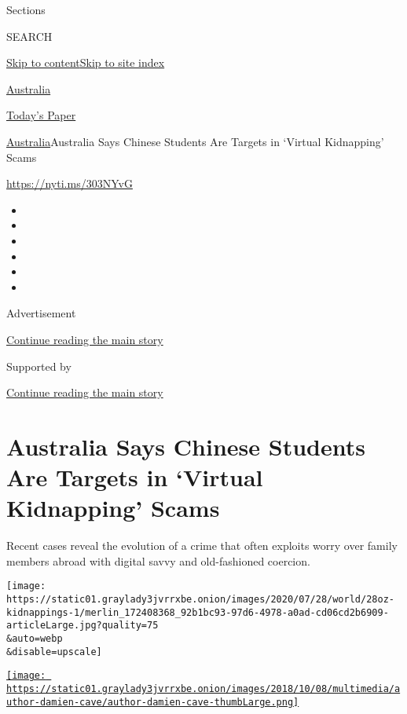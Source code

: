 Sections

SEARCH

\protect\hyperlink{site-content}{Skip to
content}\protect\hyperlink{site-index}{Skip to site index}

\href{https://www.nytimes3xbfgragh.onion/section/world/australia}{Australia}

\href{https://myaccount.nytimes3xbfgragh.onion/auth/login?response_type=cookie\&client_id=vi}{}

\href{https://www.nytimes3xbfgragh.onion/section/todayspaper}{Today's
Paper}

\href{/section/world/australia}{Australia}\textbar{}Australia Says
Chinese Students Are Targets in `Virtual Kidnapping' Scams

\url{https://nyti.ms/303NYvG}

\begin{itemize}
\item
\item
\item
\item
\item
\item
\end{itemize}

Advertisement

\protect\hyperlink{after-top}{Continue reading the main story}

Supported by

\protect\hyperlink{after-sponsor}{Continue reading the main story}

\hypertarget{australia-says-chinese-students-are-targets-in-virtual-kidnapping-scams}{%
\section{Australia Says Chinese Students Are Targets in `Virtual
Kidnapping'
Scams}\label{australia-says-chinese-students-are-targets-in-virtual-kidnapping-scams}}

Recent cases reveal the evolution of a crime that often exploits worry
over family members abroad with digital savvy and old-fashioned
coercion.

\texttt{[image: https://static01.graylady3jvrrxbe.onion/images/2020/07/28/world/28oz-kidnappings-1/merlin\_172408368\_92b1bc93-97d6-4978-a0ad-cd06cd2b6909-articleLarge.jpg?quality=75\\\&auto=webp\\\&disable=upscale]}

\href{https://www.nytimes3xbfgragh.onion/by/damien-cave}{\texttt{[image: https://static01.graylady3jvrrxbe.onion/images/2018/10/08/multimedia/author-damien-cave/author-damien-cave-thumbLarge.png]}}

